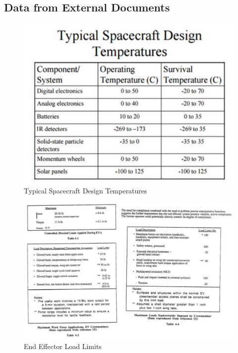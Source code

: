 \subsection*{Data from External Documents}
\begin{figure}[H]
\centering
\includegraphics[scale=0.6]{Apppic/designtemp}
\caption[Typical Spacecraft Design Temperatures]{Typical Spacecraft Design Temperatures \cite{spacedesigntemp}}
\end{figure}
\begin{figure}[H]
\centering
\includegraphics[scale=0.6]{Apppic/eeloads}
\caption[End Effector Load Limits]{End Effector Load Limits \cite{NASAEE_Mishkin}}
\end{figure}

